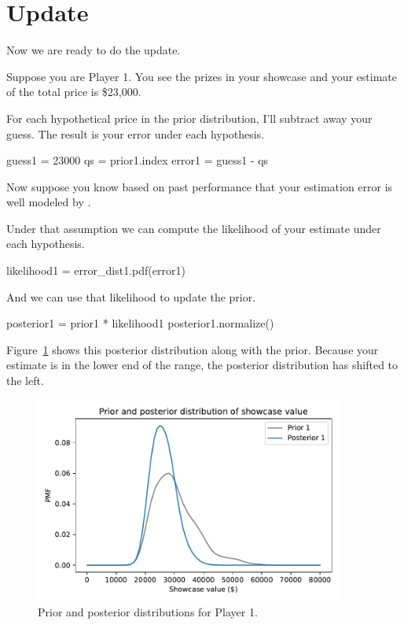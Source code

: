\documentclass[12pt]{book}
\theoremstyle{exercise}
\begin{document}
\section{Update}

Now we are ready to do the update.

Suppose you are Player 1.  You see the prizes in your showcase and your estimate of the total price is \$23,000.

For each hypothetical price in the prior distribution, I'll subtract away your guess.
The result is your error under each hypothesis.

\begin{code}
guess1 = 23000
qs = prior1.index
error1 = guess1 - qs
\end{code}

Now suppose you know based on past performance that your estimation error is well modeled by .

Under that assumption we can compute the likelihood of your estimate under each hypothesis.

\begin{code}
likelihood1 = error_dist1.pdf(error1)
\end{code}

And we can use that likelihood to update the prior.

\begin{code}
posterior1 = prior1 * likelihood1
posterior1.normalize()
\end{code}

Figure~\ref{fig08-03} shows this posterior distribution along with the prior.
Because your estimate is in the lower end of the range, the posterior distribution has shifted to the left.  

\begin{figure}
\centerline{\includegraphics[width=4in]{figs/fig08-03.pdf}}
\caption{Prior and posterior distributions for Player 1.}
\label{fig08-03}
\end{figure}
\end{document}

